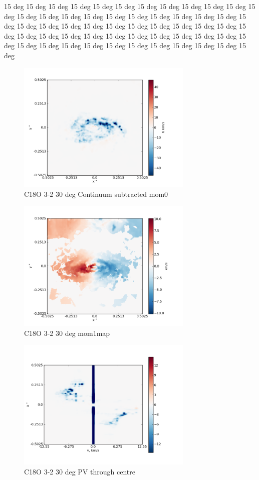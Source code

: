\documentclass[useAMS,usenatbib]{mn2e}
\begin{document}
15 deg 15 deg 15 deg 15 deg 15 deg 15 deg 15 deg 15 deg 15 deg 15 deg 15 deg 15 deg 15 deg 15 deg 15 deg 15 deg 15 deg 15 deg 15 deg 15 deg 15 deg 15 deg 15 deg 15 deg 15 deg 15 deg 15 deg 15 deg 15 deg 15 deg 15 deg 15 deg 15 deg 15 deg 15 deg 15 deg 15 deg 15 deg 15 deg 15 deg 15 deg 15 deg 15 deg 15 deg 15 deg 15 deg 15 deg 15 deg 15 deg 15 deg 15 deg 15 deg 15 deg 15 deg 15 deg 15 deg 

\begin{figure}
 \includegraphics[width=84mm]{Figures/sim/imageC18O_3-2_30deg_contSub.png}

 \caption{C18O 3-2  30 deg Continuum subtracted mom0}
\end{figure}

\begin{figure}
 \includegraphics[width=84mm]{Figures/sim/imageC18O_3-2_30deg_mom1.png}

 \caption{C18O 3-2 30 deg mom1map}
\end{figure}

\begin{figure}
 \includegraphics[width=84mm]{Figures/sim/imageC18O_3-2_30deg_PV_centre.png}

 \caption{C18O 3-2 30 deg PV through centre}
\end{figure}
\end{document}
